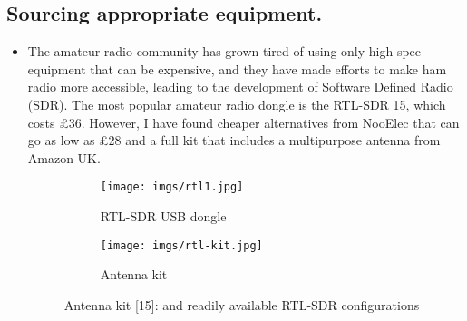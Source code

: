 \documentclass{article}
\begin{document}
    \subsection{Sourcing appropriate equipment.}
        \begin{itemize}
            \item[] The amateur radio community has grown tired of using only high-spec equipment that can be expensive, and they have made efforts to make ham radio more accessible, leading to the development of Software Defined Radio (SDR). The most popular amateur radio dongle is the RTL-SDR 15, which costs £36. However, I have found cheaper alternatives from NooElec that can go as low as £28 and a full kit that includes a multipurpose antenna from Amazon UK.

                    
                    
        \begin{figure}[H]
            \centering
            \begin{subfigure}{0.5\textwidth}
                \centering
                \texttt{[image: imgs/rtl1.jpg]}
                \caption{RTL-SDR USB dongle \cite{14}}
                \label{fig:rtl1}
            \end{subfigure}%
            \begin{subfigure}{0.5\textwidth}
                \centering
                \texttt{[image: imgs/rtl-kit.jpg]}
                \caption{Antenna kit \cite{14}}
                \label{fig:rtl-kit}
            \end{subfigure}
            \caption{Antenna kit [15]: and readily available RTL-SDR configurations}
            \label{fig:test}
        \end{figure}

        \end{itemize}
    
\end{document}
